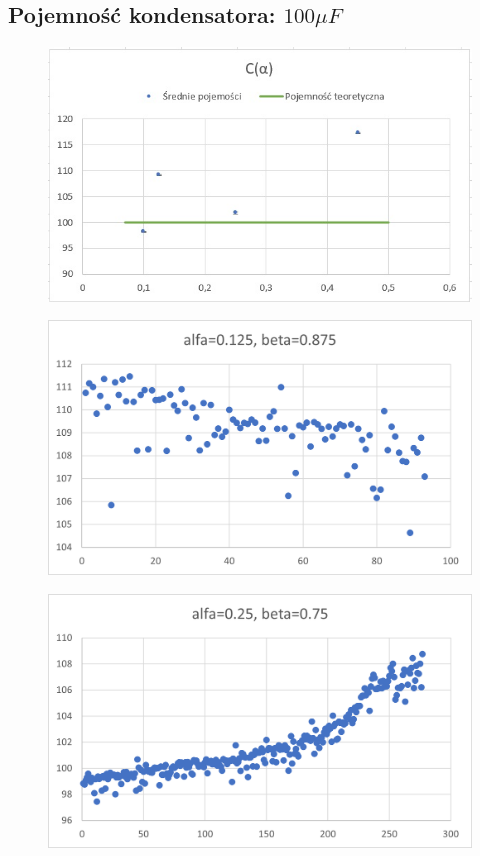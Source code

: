 \documentclass[12pt]{mwart}
\begin{document}
	\subsection{Pojemność kondensatora: $100 \mu F$}
	\begin{figure}[H]
		\centering
		\includegraphics{data/100_sr.jpg}
	\end{figure}
	\begin{figure}[H]
		\centering
		\includegraphics{data/100_a0.125.png}
	\end{figure}
	\begin{figure}[H]
		\centering
		\includegraphics{data/100_a0.25.png}
	\end{figure}
\end{document}
